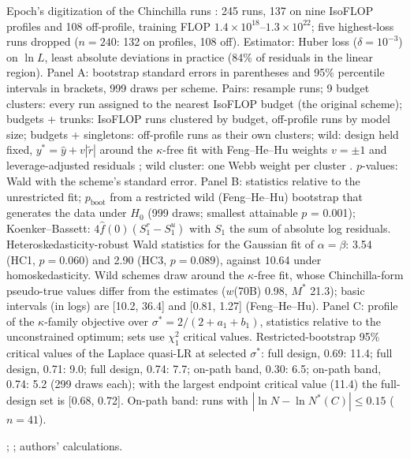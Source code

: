 \begin{table}[tp]
\begin{tablenotes}
Epoch's digitization of the Chinchilla runs \citep{besiroglu2024chinchilla}: 245 runs, 137 on nine IsoFLOP profiles and 108 off-profile, training FLOP $1.4\times10^{18}$--$1.3\times10^{22}$; five highest-loss runs dropped ($n=240$: 132 on profiles, 108 off). Estimator: Huber loss ($\delta=10^{-3}$) on $\ln L$, least absolute deviations in practice (84\% of residuals in the linear region). Panel A: bootstrap standard errors in parentheses and 95\% percentile intervals in brackets, 999 draws per scheme. Pairs: resample runs; 9 budget clusters: every run assigned to the nearest IsoFLOP budget (the original scheme); budgets + trunks: IsoFLOP runs clustered by budget, off-profile runs by model size; budgets + singletons: off-profile runs as their own clusters; wild: design held fixed, $y^*=\hat y+v|\tilde r|$ around the $\kappa$-free fit with Feng--He--Hu weights $v=\pm1$ and leverage-adjusted residuals \citep{feng2011wild}; wild cluster: one Webb weight per cluster \citep{webb2023reworking}. $p$-values: Wald with the scheme's standard error. Panel B: statistics relative to the unrestricted fit; $p_{\text{boot}}$ from a restricted wild (Feng--He--Hu) bootstrap that generates the data under $H_0$ (999 draws; smallest attainable $p$ = 0.001); Koenker--Bassett: $4\hat f(0)(S_1^r-S_1^u)$ with $S_1$ the sum of absolute log residuals. Heteroskedasticity-robust Wald statistics for the Gaussian fit of $\alpha=\beta$: 3.54 (HC1, $p=0.060$) and 2.90 (HC3, $p=0.089$), against 10.64 under homoskedasticity. Wild schemes draw around the $\kappa$-free fit, whose Chinchilla-form pseudo-true values differ from the estimates ($w$(70B) 0.98, $M^*$ 21.3); basic intervals (in logs) are [10.2, 36.4] and [0.81, 1.27] (Feng--He--Hu). Panel C: profile of the $\kappa$-family objective over $\sigma^*=2/(2+a_1+b_1)$, statistics relative to the unconstrained optimum; sets use $\chi^2_1$ critical values. Restricted-bootstrap 95\% critical values of the Laplace quasi-LR at selected $\sigma^*$: full design, 0.69: 11.4; full design, 0.71: 9.0; full design, 0.74: 7.7; on-path band, 0.30: 6.5; on-path band, 0.74: 5.2 (299 draws each); with the largest endpoint critical value (11.4) the full-design set is [0.68, 0.72]. On-path band: runs with $|\ln N-\ln N^*(C)|\le0.15$ ($n=41$).
\end{tablenotes}

\begin{tablenotes}[Source]
\citet{hoffmann2022training}; \citet{besiroglu2024chinchilla}; authors' calculations.
\end{tablenotes}
\end{table}
